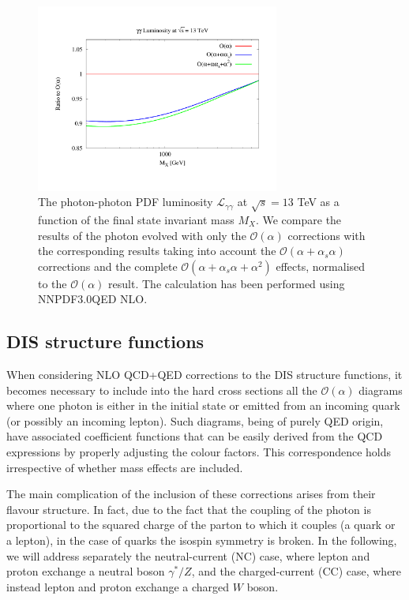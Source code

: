 \begin{figure}[t]
\includegraphics[width=8cm]{figs/lumi_13tev.pdf} 
\caption{The photon-photon PDF luminosity $\mathcal{L}_{\gamma\gamma}$ at $\sqrt{s} = 13$ TeV as a
  function of the final state invariant mass $M_X$.
  We compare the results of the photon evolved
  with only the $\mathcal{O}(\alpha)$ corrections
  with the corresponding results taking into account the 
  $\mathcal{O}(\alpha+\alpha_s\alpha)$ corrections
  and the complete
  $\mathcal{O}(\alpha+\alpha_s\alpha+\alpha^2)$ effects,
  normalised to the $\mathcal{O}(\alpha)$ result.
  The calculation has been performed using NNPDF3.0QED NLO.  }
\label{fig:GammaGammaLumi}
\end{figure}

\subsection{DIS structure functions}

When considering NLO QCD+QED corrections to the DIS structure
functions, it becomes necessary to include into the hard cross
sections all the $\mathcal{O}(\alpha)$ diagrams where one photon is
either in the initial state or emitted from an incoming quark (or
possibly an incoming lepton).
%
Such diagrams, being of purely QED origin, have associated coefficient
functions that can be easily derived from the QCD expressions by
properly adjusting the colour factors.
%
This correspondence holds irrespective of whether mass effects are
included.

The main complication of the inclusion of these corrections arises
from their flavour structure. In fact, due to the fact that the
coupling of the photon is proportional to the squared charge of the
parton to which it couples (a quark or a lepton), in the case of
quarks the isospin symmetry is broken.
%
In the following, we will address separately the neutral-current (NC)
case, where lepton and proton exchange a neutral boson $\gamma^*/Z$,
and the charged-current (CC) case, where instead lepton and proton
exchange a charged $W$ boson.

